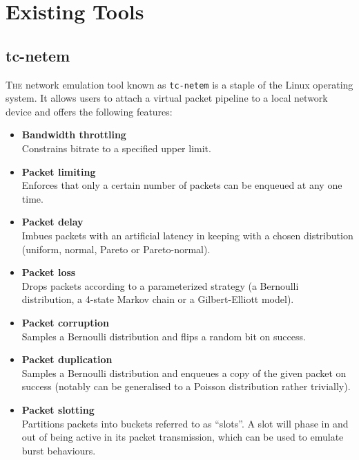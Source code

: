 \section{Existing Tools}

\subsection{tc-netem}

\lettrine{T}{he} network emulation tool known as \texttt{tc-netem} is a staple of the Linux operating
system\cite{tc_netem_wiki, tc_netem_8_man,tc_netem_src}. It allows users to attach a virtual packet pipeline to a
local network device and offers the following features:
\begin{itemize}
    \item \textbf{Bandwidth throttling} \\
    Constrains bitrate to a specified upper limit.
    \item \textbf{Packet limiting} \\
    Enforces that only a certain number of packets can be enqueued at any one time.
    \item \textbf{Packet delay} \\
    Imbues packets with an artificial latency in keeping with a chosen distribution (uniform, normal, Pareto or
    Pareto-normal).
    \item \textbf{Packet loss} \\
    Drops packets according to a parameterized strategy (a Bernoulli distribution, a 4-state Markov chain or a
    Gilbert-Elliott model\cite{ge_model}).
    \item \textbf{Packet corruption} \\
    Samples a Bernoulli distribution and flips a random bit on success.
    \item \textbf{Packet duplication} \\
    Samples a Bernoulli distribution and enqueues a copy of the given packet on success (notably can be generalised to a
    Poisson distribution rather trivially).
    \item \textbf{Packet slotting} \\
    Partitions packets into buckets referred to as ``slots''. A slot will phase in and out of being active in its
    packet transmission, which can be used to emulate burst behaviours.
\end{itemize}

